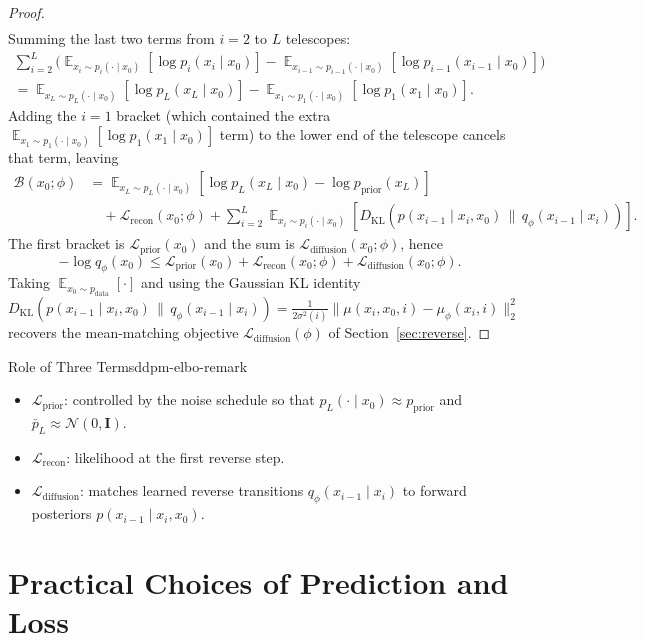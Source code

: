 \documentclass[11pt,a4paper]{article}
\DeclareMathOperator*{\E}{\mathbb{E}}
\newcommand{\cN}{\mathcal{N}}
\newcommand{\KL}[2]{D_{\mathrm{KL}}\!\left(#1\,\|\,#2\right)}
\newcommand{\pdata}{p_{\mathrm{data}}}
\newcommand{\pprior}{p_{\mathrm{prior}}}
\newcommand{\Ldiff}{\mathcal{L}_{\text{diffusion}}}
\newcommand{\Lprior}{\mathcal{L}_{\text{prior}}}
\newcommand{\Lrecon}{\mathcal{L}_{\text{recon}}}
\newcommand{\Lbound}{\mathcal{B}}
\newcommand{\bpMarg}[1]{\bar p_{#1}}
\begin{document}
\begin{proof}
\begin{align*}
\end{align*}
Summing the last two terms from $i=2$ to $L$ telescopes:
\begin{multline*}
\sum_{i=2}^{L}\Big(
\E_{x_i\sim p_i(\cdot\mid x_0)}\!\left[\log p_i(x_i\mid x_0)\right]
-\E_{x_{i-1}\sim p_{i-1}(\cdot\mid x_0)}
\!\left[\log p_{i-1}(x_{i-1}\mid x_0)\right]
\Big) \\
=\E_{x_L\sim p_L(\cdot\mid x_0)}\!\left[\log p_L(x_L\mid x_0)\right]
-\E_{x_1\sim p_1(\cdot\mid x_0)}\!\left[\log p_1(x_1\mid x_0)\right].
\end{multline*}
Adding the $i=1$ bracket (which contained the extra
$\E_{x_1\sim p_1(\cdot\mid x_0)}[\log p_1(x_1\mid x_0)]$ term) to the lower
end of the telescope cancels that term, leaving
\begin{align*}
\Lbound(x_0;\phi)
&= \E_{x_L\sim p_L(\cdot\mid x_0)}
\!\left[\log p_L(x_L\mid x_0)-\log \pprior(x_L)\right] \\
&\quad
+\Lrecon(x_0;\phi)
+\sum_{i=2}^{L}
\E_{x_i\sim p_i(\cdot\mid x_0)}
\!\left[\KL{p(x_{i-1}\mid x_i,x_0)}{q_\phi(x_{i-1}\mid x_i)}\right].
\end{align*}
The first bracket is $\Lprior(x_0)$ and the sum is $\Ldiff(x_0;\phi)$, hence
\[
-\log q_\phi(x_0)\le \Lprior(x_0)+\Lrecon(x_0;\phi)+\Ldiff(x_0;\phi).
\]
Taking $\E_{x_0\sim\pdata}[\cdot]$ and using the Gaussian KL identity
$\KL{p(x_{i-1}\mid x_i,x_0)}{q_\phi(x_{i-1}\mid x_i)}
=\frac{1}{2\sigma^2(i)}\|\mu(x_i,x_0,i)-\mu_\phi(x_i,i)\|_2^2$
recovers the mean-matching objective $\Ldiff(\phi)$ of Section~\ref{sec:reverse}.
\end{proof}

\begin{remark}{Role of Three Terms}{ddpm-elbo-remark}
\begin{itemize}[leftmargin=1.2em, itemsep=2pt]
    \item $\Lprior$: controlled by the noise schedule so that $p_L(\cdot\mid x_0)\approx\pprior$ and $\bpMarg{L}\approx \cN(0,\mathbf{I})$.
    \item $\Lrecon$: likelihood at the first reverse step.
    \item $\Ldiff$: matches learned reverse transitions $q_\phi(x_{i-1}\mid x_i)$ to forward posteriors $p(x_{i-1}\mid x_i,x_0)$.
\end{itemize}
\end{remark}

\section{Practical Choices of Prediction and Loss}\label{sec:practical}
\end{document}
